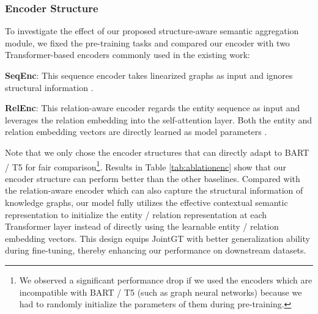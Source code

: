 \documentclass[11pt,a4paper]{article}
\begin{document}
\subsubsection{Encoder Structure}

To investigate the effect of our proposed structure-aware semantic aggregation module, we fixed the pre-training tasks and compared our encoder with two Transformer-based encoders commonly used in the existing work: 

\noindent \textbf{SeqEnc}: This sequence encoder takes linearized graphs as input and ignores structural information \cite{ribeiro2020investigate,kale2020text}.

\noindent \textbf{RelEnc}: This relation-aware encoder regards the entity sequence as input and leverages the relation embedding into the self-attention layer. Both the entity and relation embedding vectors are directly learned as model parameters \cite{shaw2018relative,zhu2019structaware,song2020structure}.


\begin{table} [!htp]
\centering
\small
{}
\caption{Ablation test of different encoder structures on WebNLG(U), including our encoder, sequence encoder (SeqEnc) and relation-aware encoder (RelEnc).}
\label{tab:ablationenc}
\end{table}




Note that we only chose the encoder structures that can directly adapt to BART / T5 for fair comparison\footnote{We observed a significant performance drop if we used the encoders which are incompatible with BART / T5 (such as graph neural networks) because we had to randomly initialize the parameters of them during pre-training.}. 
Results in Table \ref{tab:ablationenc} show that our encoder structure can perform better than the other baselines. Compared with the relation-aware encoder which can also capture the structural information of knowledge graphs, our model fully utilizes the effective contextual semantic representation to initialize the entity / relation representation at each Transformer layer instead of directly using the learnable entity / relation embedding vectors. This design equips JointGT with better generalization ability during fine-tuning, thereby enhancing our performance on downstream datasets.
\end{document}
